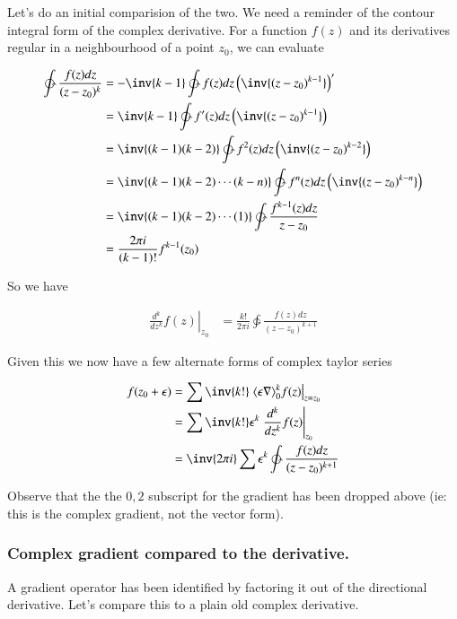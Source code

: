 \documentclass{article}
\begin{document}
Let's do an initial comparision of the two.  We need a reminder
of the contour integral form of the complex derivative.  For a function
$f(z)$ and its derivatives regular in a neighbourhood of a point $z_0$, we can evaluate

\begin{align*}
\ointctrclockwise \frac{f(z) dz}{(z - z_0)^k} 
&=
-\inv{k-1} \ointctrclockwise {f(z) dz}\left( \inv{(z - z_0)^{k-1}} \right)' \\
&=
\inv{k-1} \ointctrclockwise {f'(z) dz}\left( \inv{(z - z_0)^{k-1}} \right) \\
&=
\inv{(k-1)(k-2)} \ointctrclockwise {f^2(z) dz}\left( \inv{(z - z_0)^{k-2}} \right) \\
&=
\inv{(k-1)(k-2)\cdots(k-n)} \ointctrclockwise {f^n(z) dz}\left( \inv{(z - z_0)^{k-n}} \right) \\
&=
\inv{(k-1)(k-2)\cdots(1)} \ointctrclockwise \frac{f^{k-1}(z) dz}{z - z_0} \\
&= \frac{2 \pi i}{(k-1)!} f^{k-1}(z_0)
\end{align*}

So we have

\begin{align*}
\left. \frac{d^k}{dz^k} f(z) \right\vert_{z_0}
&= 
\frac{k!}{2 \pi i}\ointctrclockwise \frac{f(z) dz}{(z - z_0)^{k+1}} 
\end{align*}

Given this we now have a few alternate forms of complex taylor series

\begin{align*}
f(z_0 + \epsilon) 
&= \sum \inv{k!} \left. \gpgradezero{\epsilon \grad}^k f(z) \right\vert_{z=z_0} \\
&= \sum \inv{k!} \epsilon^k \left. \frac{d^k}{dz^k} f(z) \right\vert_{z_0} \\
&= \inv{2 \pi i} \sum \epsilon^k \ointctrclockwise \frac{f(z) dz}{(z - z_0)^{k+1}} 
\end{align*}

Observe that the the $0,2$ subscript for the gradient has been dropped above (ie: this is the complex gradient, not the vector 
form).

\subsubsection{ Complex gradient compared to the derivative. }

A gradient operator has been identified by factoring it out of the directional derivative.  Let's compare this to a
plain old complex derivative.
\end{document}
